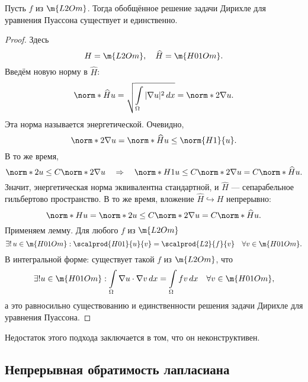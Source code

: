 \begin{theorem} Пусть $f$ из $\m{L2Om}$. Тогда обобщённое решение задачи Дирихле для уравнения Пуассона существует и единственно.
\end{theorem}
\begin{proof} Здесь
$$ H = \m{L2Om}, \quad \widehat{H} = \m{H01Om}.$$
Введём новую норму в $\widehat{H}$:
$$\norm*{\widehat{H}}{u} = \sqrt{\int \limits_\Omega | \nabla u |^2 \, dx } = \norm*{2}{\nabla u}.$$
Эта норма называется энергетической. Очевидно,
$$ \norm*{2}{\nabla u} = \norm*{\widehat{H}}{u} \leq \norm{H1}{u}.$$
В то же время,
$$ \norm*{2}{u} \leq C \norm*{2}{\nabla u} \quad \Rightarrow \quad \norm*{H1}{u} \leq C \norm*{2}{\nabla u} = C \norm*{\widehat{H}}{u}.$$
Значит, энергетическая норма эквивалентна стандартной, и $\widehat{H}$ --- сепарабельное гильбертово пространство. В то же время, вложение $\widehat{H} \hookrightarrow H$ непрерывно:
$$ \norm*{H}{u} = \norm*{2}{u} \leq C \norm*{2}{\nabla u} = C \norm*{\widehat{H}}{u}.$$
Применяем лемму. Для любого $f$ из $\m{L2Om}$ 
$$ \exists! \, u \in \m{H01Om}: \scalprod{H01}{u}{v} = \scalprod{L2}{f}{v} \quad \forall v \in \m{H01Om}.$$
В интегральной форме: существует такой $f$ из $\m{L2Om}$, что
$$ \exists ! u \in \m{H01Om} : \int \limits_\Omega \nabla u \cdot \nabla v \, dx = \int \limits_\Omega f v \, dx \quad \forall v \in \m{H01Om},$$
а это равносильно существованию и единственности решения задачи Дирихле для уравнения Пуассона.

\end{proof}

Недостаток этого подхода заключается в том, что он неконструктивен.

\subsection{Непрерывная обратимость лапласиана}

